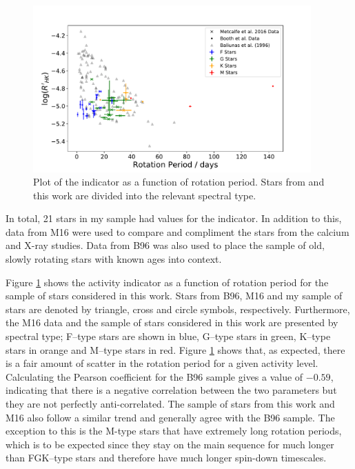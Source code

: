 \begin{figure}
    \centering
    \includegraphics[width=0.95\textwidth]{Figures/5-Activity_rotation/Rhk_v_prot.pdf}
    \caption[\Rprime indicator as a function of rotation period]{Plot of the \Rprime indicator as a function of rotation period. Stars from \citet{Metcalfe_etal_2016} and this work are divided into the relevant spectral type.}
    \label{fig:rhk_v_rot}
\end{figure}

In total, 21 stars in my sample had values for the \Rprime indicator. In addition to this, data from M16 were used to compare and compliment the stars from the calcium and X-ray studies. Data from B96 was also used to place the sample of old, slowly rotating stars with known ages into context.

Figure \ref{fig:rhk_v_rot} shows the \Rprime activity indicator as a function of rotation period for the sample of stars considered in this work. Stars from B96, M16 and my sample of stars are denoted by triangle, cross and circle symbols, respectively. Furthermore, the M16 data and the sample of stars considered in this work are presented by spectral type; F--type stars are shown in blue, G--type stars in green, K--type stars in orange and M--type stars in red. Figure \ref{fig:rhk_v_rot} shows that, as expected, there is a fair amount of scatter in the rotation period for a given activity level. Calculating the Pearson coefficient for the B96 sample gives a value of $-0.59$, indicating that there is a negative correlation between the two parameters but they are not perfectly anti-correlated. The sample of stars from this work and M16 also follow a similar trend and generally agree with the B96 sample. The exception to this is the M-type stars that have extremely long rotation periods, which is to be expected since they stay on the main sequence for much longer than FGK--type stars and therefore have much longer spin-down timescales.

